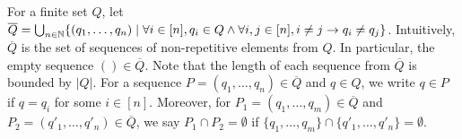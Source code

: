 


%






For a finite set $Q$, let $\overline{Q} = \bigcup_{n\in \mathbb{N}}\{ (q_1, \ldots, q_n) \mid \forall i \in [n], q_i \in Q \wedge \forall i,j \in[n], i \neq j \rightarrow q_i \neq q_j \}$. Intuitively, $\overline{Q}$ is the set of sequences of non-repetitive elements from $Q$. In particular, the empty sequence $() \in \overline{Q}$. Note that the length of each sequence from $\overline{Q}$ is bounded by  $| Q |$. For a sequence $P = (q_1, \ldots, q_n) \in \overline{Q}$ and  $q \in Q$, we write $q \in P$ if  $q = q_i$ for some $i \in [n]$. Moreover, for $P_1 = (q_1, \ldots, q_m) \in \overline{Q}$ and $P_2 = (q'_1, \ldots, q'_n) \in \overline{Q}$, we say $P_1 \cap P_2 = \emptyset$ if $\{q_1, \ldots, q_m\} \cap \{q'_1, \ldots, q'_n\} = \emptyset$.
    


